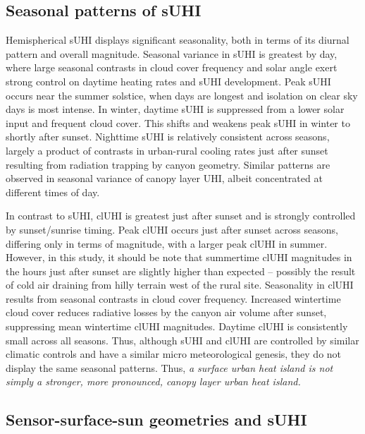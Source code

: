 \subsection{Seasonal patterns of sUHI}

Hemispherical sUHI displays significant seasonality, both in terms of its diurnal pattern and overall magnitude. Seasonal variance in sUHI is greatest by day, where large seasonal contrasts in cloud cover frequency and solar angle exert strong control on daytime heating rates and sUHI development. Peak sUHI occurs near the summer solstice, when days are longest and isolation on clear sky days is most intense. In winter, daytime sUHI is suppressed from a lower solar input and frequent cloud cover. This shifts and weakens peak sUHI in winter to shortly after sunset. Nighttime sUHI is relatively consistent across seasons, largely a product of contrasts in urban-rural cooling rates just after sunset resulting from radiation trapping by canyon geometry. Similar patterns are observed in seasonal variance of canopy layer UHI, albeit concentrated at different times of day. 

In contrast to sUHI, clUHI is greatest just after sunset and is strongly controlled by sunset/sunrise timing. Peak clUHI occurs just after sunset across seasons, differing only in terms of magnitude, with a larger peak clUHI in summer. However, in this study, it should be note that summertime clUHI magnitudes in the hours just after sunset are slightly higher than expected \cite{Runnalls2000} – possibly the result of cold air draining from hilly terrain west of the rural site. Seasonality in clUHI results from seasonal contrasts in cloud cover frequency. Increased wintertime cloud cover reduces radiative losses by the canyon air volume after sunset, suppressing mean wintertime clUHI magnitudes. Daytime clUHI is consistently small across all seasons. Thus, although sUHI and clUHI are controlled by similar climatic controls and have a similar micro meteorological genesis, they do not display the same seasonal patterns. Thus, \textit{a surface urban heat island is not simply a stronger, more pronounced, canopy layer urban heat island.}

\subsection{Sensor-surface-sun geometries and sUHI}

